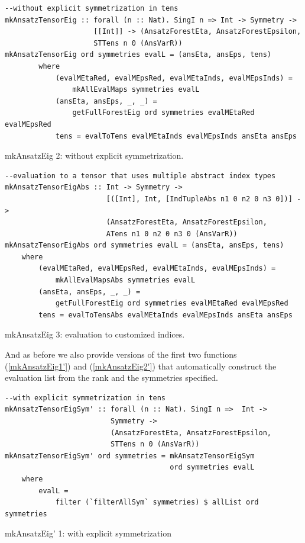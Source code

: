 \documentclass[a4paper,12pt, DIV=14, BCOR=5mm, twoside, headsepline, numbers=noenddot]{scrbook}
\begin{document}
\begin{listing}[hbt!]
\begin{verbatim}
--without explicit symmetrization in tens
mkAnsatzTensorEig :: forall (n :: Nat). SingI n => Int -> Symmetry ->
                     [[Int]] -> (AnsatzForestEta, AnsatzForestEpsilon,
                     STTens n 0 (AnsVarR))
mkAnsatzTensorEig ord symmetries evalL = (ansEta, ansEps, tens)
        where
            (evalMEtaRed, evalMEpsRed, evalMEtaInds, evalMEpsInds) =
                mkAllEvalMaps symmetries evalL 
            (ansEta, ansEps, _, _) =
                getFullForestEig ord symmetries evalMEtaRed evalMEpsRed
            tens = evalToTens evalMEtaInds evalMEpsInds ansEta ansEps
\end{verbatim} 
\caption{mkAnsatzEig 2: without explicit symmetrization.}\label{mkAnsatzEig2}
\end{listing}

\begin{listing}[hbt!]
\begin{verbatim}
--evaluation to a tensor that uses multiple abstract index types
mkAnsatzTensorEigAbs :: Int -> Symmetry ->
                        [([Int], Int, [IndTupleAbs n1 0 n2 0 n3 0])] ->
                        (AnsatzForestEta, AnsatzForestEpsilon,
                        ATens n1 0 n2 0 n3 0 (AnsVarR))
mkAnsatzTensorEigAbs ord symmetries evalL = (ansEta, ansEps, tens)
    where
        (evalMEtaRed, evalMEpsRed, evalMEtaInds, evalMEpsInds) =
            mkAllEvalMapsAbs symmetries evalL 
        (ansEta, ansEps, _, _) =
            getFullForestEig ord symmetries evalMEtaRed evalMEpsRed
        tens = evalToTensAbs evalMEtaInds evalMEpsInds ansEta ansEps
\end{verbatim} 
\caption{mkAnsatzEig 3: evaluation to customized indices.}\label{mkAnsatzEig3}
\end{listing}

And as before we also provide versions of the first two functions (\ref{mkAnsatzEig1'}) and (\ref{mkAnsatzEig2'}) that automatically construct the evaluation list from the rank and the symmetries specified.

\begin{listing}[hbt!]
\begin{verbatim}
--with explicit symmetrization in tens
mkAnsatzTensorEigSym' :: forall (n :: Nat). SingI n =>  Int ->
                         Symmetry ->
                         (AnsatzForestEta, AnsatzForestEpsilon,
                         STTens n 0 (AnsVarR))
mkAnsatzTensorEigSym' ord symmetries = mkAnsatzTensorEigSym
                                       ord symmetries evalL
    where
        evalL =
            filter (`filterAllSym` symmetries) $ allList ord symmetries
\end{verbatim} 
\caption{mkAnsatzEig' 1: with explicit symmetrization}\label{mkAnsatzEig1'}
\end{listing}
\end{document}
